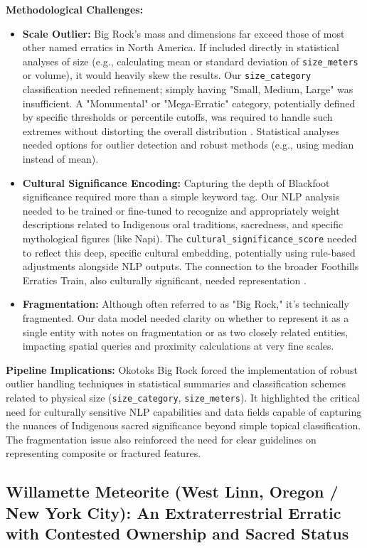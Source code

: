 \documentclass[
11pt, %
english, %
singlespacing, %
headsepline, %
]{MastersDoctoralThesis} %
\begin{document}
\textbf{Methodological Challenges:}
\begin{itemize}
    \item \textbf{Scale Outlier:} Big Rock's mass and dimensions far exceed those of most other named erratics in North America. If included directly in statistical analyses of size (e.g., calculating mean or standard deviation of \texttt{size\_meters} or volume), it would heavily skew the results. Our \texttt{size\_category} classification needed refinement; simply having "Small, Medium, Large" was insufficient. A "Monumental" or "Mega-Erratic" category, potentially defined by specific thresholds or percentile cutoffs, was required to handle such extremes without distorting the overall distribution \cite{Cuffey2010}. Statistical analyses needed options for outlier detection and robust methods (e.g., using median instead of mean).
    \item \textbf{Cultural Significance Encoding:} Capturing the depth of Blackfoot significance required more than a simple keyword tag. Our NLP analysis needed to be trained or fine-tuned to recognize and appropriately weight descriptions related to Indigenous oral traditions, sacredness, and specific mythological figures (like Napi). The \texttt{cultural\_significance\_score} needed to reflect this deep, specific cultural embedding, potentially using rule-based adjustments alongside NLP outputs. The connection to the broader Foothills Erratics Train, also culturally significant, needed representation \cite{Klassen1995}.
    \item \textbf{Fragmentation:} Although often referred to as "Big Rock," it's technically fragmented. Our data model needed clarity on whether to represent it as a single entity with notes on fragmentation or as two closely related entities, impacting spatial queries and proximity calculations at very fine scales.
\end{itemize}

\textbf{Pipeline Implications:} Okotoks Big Rock forced the implementation of robust outlier handling techniques in statistical summaries and classification schemes related to physical size (\texttt{size\_category}, \texttt{size\_meters}). It highlighted the critical need for culturally sensitive NLP capabilities and data fields capable of capturing the nuances of Indigenous sacred significance beyond simple topical classification. The fragmentation issue also reinforced the need for clear guidelines on representing composite or fractured features.

\subsection{Willamette Meteorite (West Linn, Oregon / New York City): An Extraterrestrial Erratic with Contested Ownership and Sacred Status}
\label{subsec:willamette}
\end{document}

